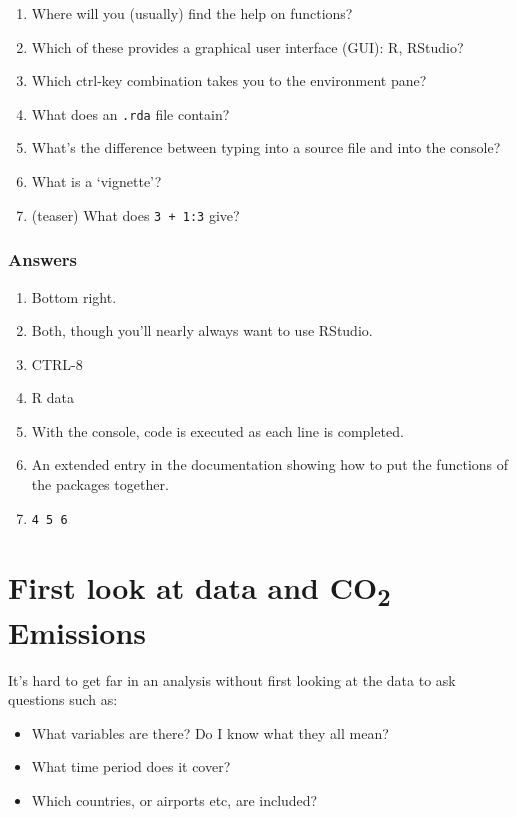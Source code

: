 \documentclass[
]{book}
\providecommand{\tightlist}{%
  \setlength{\itemsep}{0pt}\setlength{\parskip}{0pt}}
\begin{document}
\begin{enumerate}
\def\labelenumi{\arabic{enumi}.}
\tightlist
\item
  Where will you (usually) find the help on functions?
\item
  Which of these provides a graphical user interface (GUI): R, RStudio?
\item
  Which ctrl-key combination takes you to the environment pane?
\item
  What does an \texttt{.rda} file contain?
\item
  What's the difference between typing into a source file and into the console?
\item
  What is a `vignette'?
\item
  (teaser) What does \texttt{3\ +\ 1:3} give?
\end{enumerate}

\hypertarget{answers}{%
\subsection{Answers}\label{answers}}

\begin{enumerate}
\def\labelenumi{\arabic{enumi}.}
\tightlist
\item
  Bottom right.
\item
  Both, though you'll nearly always want to use RStudio.
\item
  CTRL-8
\item
  R data
\item
  With the console, code is executed as each line is completed.
\item
  An extended entry in the documentation showing how to put the functions of the packages together.
\item
  \texttt{4\ 5\ 6}
\end{enumerate}

\hypertarget{first-look-at-data-and-co2-emissions}{%
\chapter{\texorpdfstring{First look at data and CO\textsubscript{2} Emissions}{First look at data and CO2 Emissions}}\label{first-look-at-data-and-co2-emissions}}

It's hard to get far in an analysis without first looking at the data to ask questions such as:

\begin{itemize}
\tightlist
\item
  What variables are there? Do I know what they all mean?
\item
  What time period does it cover?
\item
  Which countries, or airports etc, are included?
\end{itemize}
\end{document}
